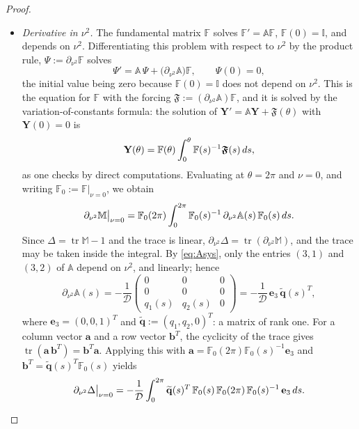 \documentclass[10pt,a4paper]{amsart}
\newcommand{\F}{\mathbb{F}}
\newcommand{\D}{\mathcal{D}}
\newcommand{\tr}{\operatorname{tr}}     %
\begin{document}
\begin{proof}
\begin{enumerate}
\begin{itemize}
\item \emph{Derivative in $\nu^2$.} The fundamental matrix $\F$ solves $\F'=\mathbb A\F$, $\F(0)=\mathbb I$, and depends on $\nu^2$. Differentiating this problem with respect to $\nu^2$ by the product rule, $\Psi:=\partial_{\nu^2}\F$ solves
\[
\Psi'=\mathbb A\,\Psi+\big(\partial_{\nu^2}\mathbb A\big)\F,\qquad \Psi(0)=0,
\]
the initial value being zero because $\F(0)=\mathbb I$ does not depend on $\nu^2$. This is the equation for $\F$ with the  forcing $\boldsymbol{\mathfrak{ F}}:=(\partial_{\nu^2}\mathbb A)\F$, and it is solved by the variation-of-constants formula: the solution of $\mathbf Y'=\mathbb A\mathbf Y+\boldsymbol{\mathfrak{ F}}(\theta)$ with $\mathbf Y(0)=0$ is
\[
\mathbf Y(\theta)=\F(\theta)\int_0^{\theta}\F(s)^{-1}\boldsymbol{\mathfrak{ F}}(s)\,{\rm d}s,
\]
as one checks by direct computations. Evaluating at $\theta=2\pi$ and $\nu=0$, and writing $\F_0:=\F|_{\nu=0}$, we obtain
\[
\partial_{\nu^2}\mathbb M\big|_{\nu=0}=\F_0(2\pi)\int_0^{2\pi}\F_0(s)^{-1}\,\partial_{\nu^2}\mathbb A(s)\,\F_0(s)\,{\rm d}s .
\]
Since $\Delta=\tr\mathbb M-1$ and the trace is linear, $\partial_{\nu^2}\Delta=\tr(\partial_{\nu^2}\mathbb M)$, and the trace may be taken inside the integral. By \eqref{eq:Asys}, only the entries $(3,1)$ and $(3,2)$ of $\mathbb A$ depend on $\nu^2$, and linearly; hence
\[
\partial_{\nu^2}\mathbb A(s)=-\frac{1}{\D}\begin{pmatrix}0&0&0\\0&0&0\\ q_1(s)&q_2(s)&0\end{pmatrix}
=-\frac{1}{\D}\,\mathbf e_3\,\widetilde{\mathbf q}(s)^T,
\]
where $\mathbf e_3=(0,0,1)^T$ and $\widetilde{\mathbf q}:=(q_1,q_2,0)^T$: a matrix of rank one. For a column vector $\mathbf a$ and a row vector $\mathbf b^T$, the cyclicity of the trace gives $\tr(\mathbf a\,\mathbf b^T)=\mathbf b^T\mathbf a$. Applying this with $\mathbf a=\F_0(2\pi)\F_0(s)^{-1}\mathbf e_3$ and $\mathbf b^T=\widetilde{\mathbf q}(s)^T\F_0(s)$ yields
\begin{equation}\label{eq:dDdnu0}
\partial_{\nu^2}\Delta\big|_{\nu=0}=-\frac{1}{\D}\int_0^{2\pi}\widetilde{\mathbf q}(s)^T\,\F_0(s)\,\F_0(2\pi)\,\F_0(s)^{-1}\,\mathbf e_3\,{\rm d}s .
\end{equation}


\end{itemize}
\end{enumerate}
\end{proof}
\end{document}
